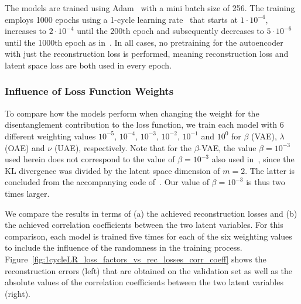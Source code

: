 The models are trained using Adam~\cite{Kingma:2015} with a mini batch size of 256. The training employs 1000 epochs using a 1-cycle learning rate~\cite{smith:2018} that starts at $1\cdot 10^{-4}$, increases to $2\cdot 10^{-4}$ until the 200th epoch and subsequently decreases to $5\cdot 10^{-6}$ until the 1000th epoch as in~\cite{solera-rico:2024}. In all cases, no pretraining for the autoencoder with just the reconstruction loss is performed, meaning reconstruction loss and latent space loss are both used in every epoch. 


\subsubsection{Influence of Loss Function Weights}
\label{sec:periodicflow_loss_function_weights}
To compare how the models perform when changing the weight for the disentanglement contribution to the loss function, we train each model with 6 different weighting values $10^{-5}$, $10^{-4}$, $10^{-3}$, $10^{-2}$, $10^{-1}$ and $10^{0}$ for $\beta$ (VAE), $\lambda$ (OAE) and $\nu$ (UAE), respectively. 
%
Note that for the $\beta$-VAE, the value $\beta=10^{-3}$ used herein does not correspond to the value of $\beta=10^{-3}$ also used in~\cite{solera-rico:2024}, since the KL divergence was divided by the latent space dimension of $m=2$. The latter is concluded from the accompanying code of~\cite{solera-rico:2024}. Our value of $\beta=10^{-3}$ is thus two times larger. 

We compare the results in terms of (a) the achieved reconstruction losses and (b) the achieved correlation coefficients between the two latent variables.
For this comparison, each model is trained five times for each of the six weighting values to include the influence of the randomness in the training process. 
Figure~\ref{fig:1cycleLR_loss_factors_vs_rec_losses_corr_coeff} shows the reconstruction errors (left) that are obtained on the validation set as well as the absolute values of the correlation coefficients between the two latent variables (right). 

